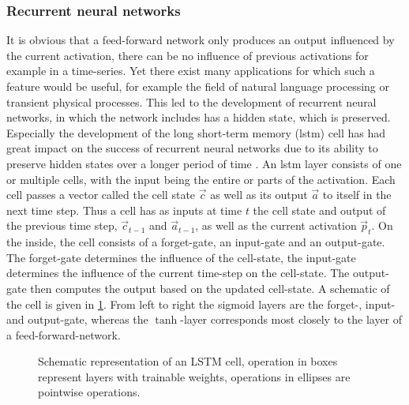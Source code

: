 \subsubsection{Recurrent neural networks}
It is obvious that a feed-forward network only produces an output influenced by the current activation, there can be no influence of previous activations for example in a time-series. Yet there exist many applications for which such a feature would be useful, for example the field of natural language processing \cite{ghosh_contextual_2016} or transient physical processes. This led to the development of recurrent neural networks, in which the network includes has a hidden state, which is preserved. Especially the development of the long short-term memory (lstm)  cell has had great impact on the success of recurrent neural networks due to its ability to preserve hidden states over a longer period of time \cite{hochreiter_long_1997}. An lstm layer consists of one or multiple cells, with the input being the entire or parts of the activation. Each cell passes a vector called the cell state $\vec{c}$ as well as its output $\vec{a}$ to itself in the next time step. Thus a cell has as inputs at time $t$ the cell state and output of the previous time step, $\vec{c}_{t-1}$ and $\vec{a}_{t-1}$, as well as the current activation $\vec{p}_t$. On the inside, the cell consists of a forget-gate, an input-gate and an output-gate. The forget-gate determines the influence of the cell-state, the input-gate determines the influence of the current time-step on the cell-state. The output-gate then computes the output based on the updated cell-state. A schematic of the cell is given in \ref{fig:lstm}. From left to right the sigmoid layers are the forget-, input- and output-gate, whereas the $\tanh$-layer corresponds most closely to the layer of a feed-forward-network. 
\begin{figure}
	\centering
	\def\svgwidth{0.5 \textwidth}
	
	\caption{Schematic representation of an LSTM cell, operation in boxes represent layers with trainable weights, operations in ellipses are pointwise operations.}
	\label{fig:lstm}
\end{figure} 

